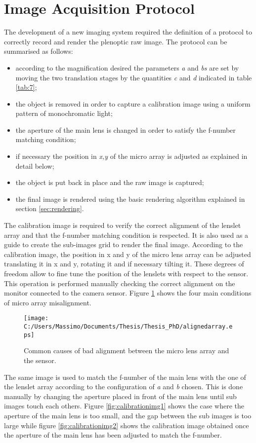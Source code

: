\section{Image Acquisition Protocol}
\label{sec:protocol}
The development of a new imaging system required the definition of a protocol to correctly record and render the plenoptic raw image. The protocol can be summarised as follows:
\begin{itemize}
	\item according to the magnification desired the parameters \textit{a} and \textit{bs} are set by moving the two translation stages by the quantities \textit{c} and \textit{d} indicated in table \ref{tab:7};
	\item the object is removed in order to capture a calibration image using a uniform pattern of monochromatic light;
	\item the aperture of the main lens is changed in order to satisfy the f-number matching condition;
	\item if necessary the position in \textit{x,y} of the micro array is adjusted as explained in detail below; 
	\item the object is put back in place and the raw image is captured;
	\item the final image is rendered using the basic rendering algorithm explained in section \ref{sec:rendering}.
\end{itemize} 
The calibration image is required to verify the correct alignment of the lenslet array and that the f-number matching condition is respected. It is also used as a guide to create the sub-images grid to render the final image. According to the calibration image, the position in x and y of the micro lens array can be adjusted translating it in x and y, rotating it and if necessary tilting it. These degrees of freedom allow to fine tune the position of the lenslets with respect to the sensor. This operation is performed manually checking the correct alignment on the monitor connected to the camera sensor. Figure \ref{fig:calibrationimg3} shows the four main conditions of micro array misalignment.
\begin{figure}[H]
	\centering
	\texttt{[image: C:/Users/Massimo/Documents/Thesis/Thesis\_PhD/alignedarray.eps]}
	\caption{\label{fig:calibrationimg3} Common causes of bad alignment between the micro lens array and the sensor. }
\end{figure}
The same image is used to match the f-number of the main lens with the one of the lenslet array according to the configuration of \textit{a} and \textit{b} chosen. This is done manually by changing the aperture placed in front of the main lens until sub images touch each others. Figure \ref{fig:calibrationimg1} shows the case where the aperture of the main lens is too small, and the gap between the sub images is too large while figure \ref{fig:calibrationimg2} shows the calibration image obtained once the aperture of the main lens has been adjusted to match the f-number.
